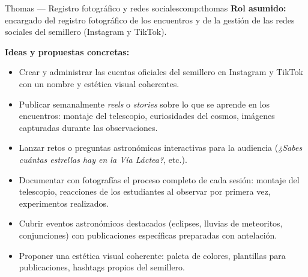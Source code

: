 \begin{compromiso}{Thomas — Registro fotográfico y redes sociales}{comp:thomas}
    \textbf{Rol asumido:} encargado del registro fotográfico de los encuentros y de la
    gestión de las redes sociales del semillero (Instagram y TikTok).

    \medskip
    \textbf{Ideas y propuestas concretas:}
    \begin{itemize}[leftmargin=1.5em]
        \item Crear y administrar las cuentas oficiales del semillero en Instagram y
              TikTok con un nombre y estética visual coherentes.
        \item Publicar semanalmente \textit{reels} o \textit{stories} sobre lo que se
              aprende en los encuentros: montaje del telescopio, curiosidades del cosmos,
              imágenes capturadas durante las observaciones.
        \item Lanzar retos o preguntas astronómicas interactivas para la audiencia
              (\textit{¿Sabes cuántas estrellas hay en la Vía Láctea?}, etc.).
        \item Documentar con fotografías el proceso completo de cada sesión: montaje
              del telescopio, reacciones de los estudiantes al observar por primera vez,
              experimentos realizados.
        \item Cubrir eventos astronómicos destacados (eclipses, lluvias de meteoritos,
              conjunciones) con publicaciones específicas preparadas con antelación.
        \item Proponer una estética visual coherente: paleta de colores, plantillas para
              publicaciones, hashtags propios del semillero.
    \end{itemize}
\end{compromiso}

